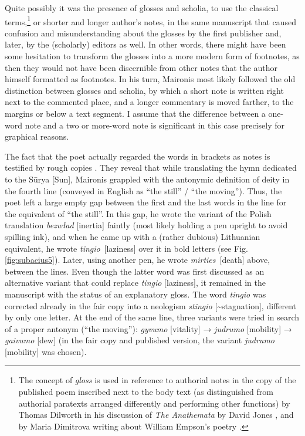 \documentclass{article}
\begin{document}
Quite possibly it was the presence of glosses and scholia, to use
the classical terms,\footnote{The concept of \emph{gloss} is used in
  reference to authorial notes in the copy of the published poem
  inscribed next to the body text (as distinguished from authorial
  paratexts arranged differently and performing other functions) by
  Thomas Dilworth in his discussion of \emph{The Anathemata} by David
  Jones \citep{dilworth_david_1980}, and by Maria Dimitrova writing about William
  Empson's poetry \citep{dimitrova_decorus_2012}.} or shorter and longer author's
notes, in the same manuscript that caused confusion and misunderstanding
about the glosses by the first publisher and, later, by the (scholarly) editors
as well. In other words, there might have been some hesitation to
transform the glosses into a more modern form of footnotes, as then they
would not have been discernible from other notes that the author himself formatted as footnotes. In his turn, Maironis most likely followed the old
distinction between glosses and scholia, by which a short note is
written right next to the commented place, and a longer commentary is
moved farther, to the margins or below a text segment. I assume that the
difference between a one-word note and a two or more-word note is
significant in this case precisely for graphical reasons.

The fact that the poet actually regarded the words in brackets as notes
is testified by rough copies \citep[6v and 9v]{maironis_daiktu_1922}. They reveal
that while translating the hymn dedicated to the Sūrya {[}Sun{]},
Maironis grappled with the antonymic definition of deity in the fourth
line (conveyed in English as ``the still'' / ``the moving''). Thus, the
poet left a large empty gap between the first and the last words in the
line for the equivalent of ``the still''. In this gap, he wrote the
variant of the Polish translation \emph{bezwład} {[}inertia{]} faintly
(most likely holding a pen upright to avoid spilling ink), and when he
came up with a (rather dubious) Lithuanian equivalent, he wrote
\emph{tingio}~{[}laziness{]} over it in bold letters (see Fig. \ref{fig:subacius5}).
Later, using another pen, he wrote \emph{mirties}~{[}death{]} above,
between the lines. Even though the latter word was first discussed as an
alternative variant that could replace \emph{tingio} {[}laziness{]}, it
remained in the manuscript with the status of an explanatory gloss. The
word \emph{tingio} was corrected already in the fair copy into a
neologism \emph{stingio} {[}\textasciitilde stagnation{]}, different by
only one letter. At the end of the same line, three variants were tried
in search of a proper antonym (``the moving''): \emph{gyvumo}
{[}vitality{]} → \emph{judrumo} {[}mobility{]} → \emph{gaivumo}
{[}dew{]} (in the fair copy and published version, the variant
\emph{judrumo} {[}mobility{]} was chosen).
\end{document}
